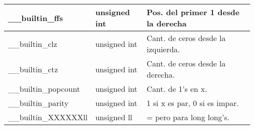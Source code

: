 \begin{tabular}{|l|l|p{5.4cm}|}
\_\_builtin\_ffs& unsigned int & Pos. del primer 1 desde la derecha\\\hline
\_\_builtin\_clz & unsigned int & Cant. de ceros desde la izquierda.\\\hline
\_\_builtin\_ctz & unsigned int & Cant. de ceros desde la derecha.\\\hline
\_\_builtin\_popcount & unsigned int & Cant. de 1’s en x.\\\hline
\_\_builtin\_parity & unsigned int & 1 si x es par, 0 si es impar.\\\hline
\_\_builtin\_XXXXXXll & unsigned ll & = pero para long long's.\\\hline
\end{tabular}\newpage